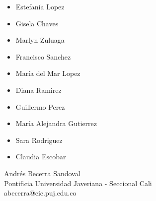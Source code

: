 \begin{itemize}
   \item Estefanía Lopez 
   \item Gisela Chaves 
   \item Marlyn Zuluaga 
   \item Francisco Sanchez
   \item María del Mar Lopez
   \item Diana Ramirez
   \item Guillermo Perez
   \item María Alejandra Gutierrez
   \item Sara Rodriguez
   \item Claudia Escobar 
\end{itemize}
  

\vspace{0.25in}
\begin{flushleft}
Andrés Becerra Sandoval \\
Pontificia Universidad Javeriana - Seccional Cali \\
abecerra@cic.puj.edu.co \\

\end{flushleft}


